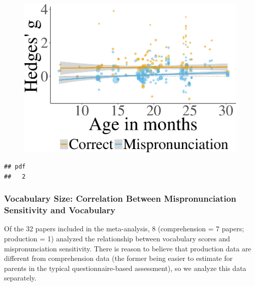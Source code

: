 \documentclass[man]{apa6}
\theoremstyle{definition}
\theoremstyle{definition}
\theoremstyle{definition}
\theoremstyle{remark}
\begin{document}
\begin{figure}[htbp]
\centering
\includegraphics{Paper_Analyses_files/figure-latex/PlotMPEffect-1.pdf}
\caption{}
\end{figure}

\begin{verbatim}
## pdf 
##   2
\end{verbatim}

\subsubsection{Vocabulary Size: Correlation Between Mispronunciation
Sensitivity and
Vocabulary}\label{vocabulary-size-correlation-between-mispronunciation-sensitivity-and-vocabulary}

Of the 32 papers included in the meta-analysis, 8 (comprehension = 7
papers; production = 1) analyzed the relationship between vocabulary
scores and mispronunciation sensitivity. There is reason to believe that
production data are different from comprehension data (the former being
easier to estimate for parents in the typical questionnaire-based
assessment), so we analyze this data separately.
\end{document}
